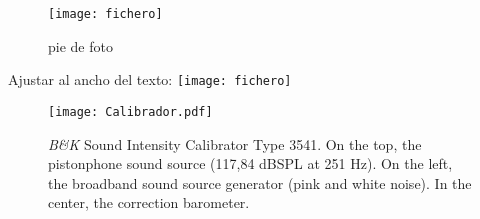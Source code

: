 


\usepackage{graphicx}

\begin{figure}
  \centering
    \texttt{[image: fichero]}
  \caption{pie de foto}
  \label{fig:nombreParaReferirnos}
\end{figure}

Ajustar al ancho del texto:
\texttt{[image: fichero]}




\begin{figure}[!ht]
  \centering
    \texttt{[image: Calibrador.pdf]}
  \caption{\textit{B\&K} Sound Intensity Calibrator Type 3541. On the top, the pistonphone sound source (117,84 dBSPL at 251 Hz). On the left, the broadband sound source generator (pink and white noise). In the center, the correction barometer. }
  \label{Calibrador}
\end{figure}
